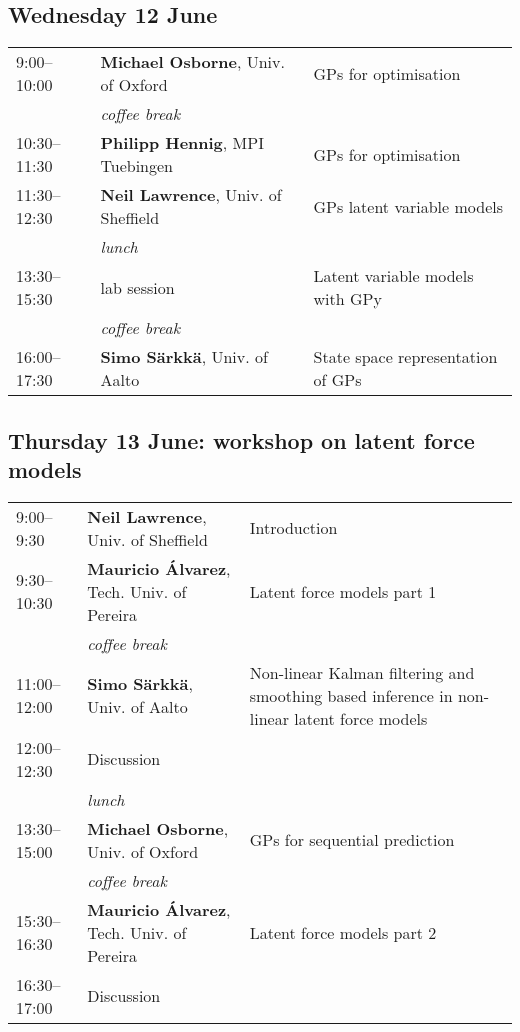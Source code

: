 \documentclass{article}
\begin{document}
\vspace{0.5cm}
\subsection*{\textcolor{MyDarkBlue}{Wednesday 12 June}}
\begin{tabular}{l p{6.5cm} p{7.75cm}}
9:00--10:00 & \textbf{Michael Osborne}, Univ. of Oxford  & GPs for optimisation \\
 & \textit{coffee break} & \\
10:30--11:30 & \textbf{Philipp Hennig}, MPI Tuebingen  & GPs for optimisation \\
11:30--12:30 & \textbf{Neil Lawrence}, Univ. of Sheffield  & GPs latent variable models \\
& \textit{lunch} & \\
13:30--15:30 & lab session & Latent variable models with GPy \\
 & \textit{coffee break} & \\
16:00--17:30 & \textbf{Simo S\"arkk\"a}, Univ. of Aalto & State space representation of GPs \\
\end{tabular}

\vspace{1cm}
\subsection*{\textcolor{MyDarkBlue}{Thursday 13 June: workshop on latent force models}}
\begin{tabular}{l p{6.5cm} p{7.75cm}}
9:00--9:30 & \textbf{Neil Lawrence}, Univ. of Sheffield  & Introduction \\
9:30--10:30 & \textbf{Mauricio \'{A}lvarez}, Tech. Univ. of Pereira  & Latent force models part 1 \\
 & \textit{coffee break} & \\
11:00--12:00 & \textbf{Simo S\"arkk\"a}, Univ. of Aalto &  Non-linear Kalman filtering and smoothing based inference in non-linear latent force models \\
12:00--12:30 & Discussion & \\
& \textit{lunch} & \\
13:30--15:00 & \textbf{Michael Osborne}, Univ. of Oxford  & GPs for sequential prediction \\
 & \textit{coffee break} & \\
15:30--16:30 & \textbf{Mauricio \'{A}lvarez}, Tech. Univ. of Pereira  & Latent force models part 2 \\
16:30--17:00 & Discussion & \\
\end{tabular}
\end{document}
